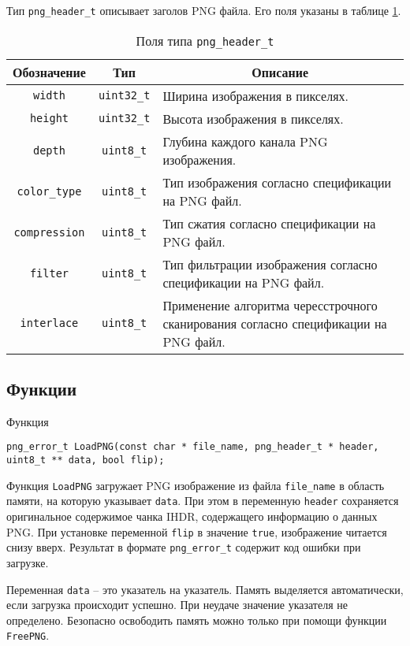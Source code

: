 \documentclass[a4paper,12pt]{article}
\begin{document}
Тип \texttt{png\_header\_t} описывает заголов PNG файла. Его поля указаны в таблице \ref{table:png_header_t}.

\begin{table}[!h]
  \caption{Поля типа \texttt{png\_header\_t}}
  \label{table:png_header_t}
  \begin{tabular}{|c|c|p{8cm}|}
    \hline
    \multicolumn{1}{|c|}{\textbf{Обозначение}} & \multicolumn{1}{|c|}{\textbf{Тип}} & \multicolumn{1}{|c|}{\textbf{Описание}} \\ \hline
    \texttt{width} & \texttt{uint32\_t} & Ширина изображения в пикселях. \\ \hline
    \texttt{height} & \texttt{uint32\_t} & Высота изображения в пикселях. \\ \hline
    \texttt{depth} & \texttt{uint8\_t} & Глубина каждого канала PNG изображения. \\ \hline
    \texttt{color\_type} & \texttt{uint8\_t} & Тип изображения согласно спецификации на PNG файл. \\ \hline
    \texttt{compression} & \texttt{uint8\_t} & Тип сжатия согласно спецификации на PNG файл. \\ \hline
    \texttt{filter} & \texttt{uint8\_t} & Тип фильтрации изображения согласно спецификации на PNG файл. \\ \hline
    \texttt{interlace} & \texttt{uint8\_t} & Применение алгоритма чересстрочного сканирования согласно спецификации на PNG файл. \\ \hline
  \end{tabular}
\end{table}

\subsection{Функции}
Функция

\leftskip=1.5cm
\texttt{png\_error\_t LoadPNG(const char * file\_name, png\_header\_t * header, uint8\_t ** data, bool flip);}

\leftskip=0cm
Функция \texttt{LoadPNG} загружает PNG изображение из файла \texttt{file\_name} в область памяти, на которую указывает \texttt{data}. При этом в переменную \texttt{header} сохраняется оригинальное содержимое чанка IHDR, содержащего информацию о данных PNG. При установке переменной \texttt{flip} в значение \texttt{true}, изображение читается снизу вверх. Результат в формате \texttt{png\_error\_t} содержит код ошибки при загрузке.

Переменная \texttt{data} -- это указатель на указатель. Память выделяется автоматически, если загрузка происходит успешно. При неудаче значение указателя не определено. Безопасно освободить память можно только при помощи функции \texttt{FreePNG}.
\end{document}
